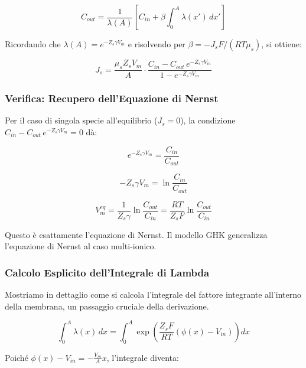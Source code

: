 \begin{equation}
C_{out} = \frac{1}{\lambda(A)}\left[C_{in} + \beta \int_0^A \lambda(x')\,dx'\right]
\end{equation}

Ricordando che $\lambda(A) = e^{-Z_s \gamma V_m}$ e risolvendo per $\beta = -J_s F/(RT\mu_s)$, si ottiene:

\begin{equation}
J_s = \frac{\mu_s Z_s  V_m}{A} \cdot \frac{C_{in} - C_{out}\,e^{-Z_s \gamma V_m}}{1 - e^{-Z_s \gamma V_m}}
\end{equation}

\subsubsection{Verifica: Recupero dell'Equazione di Nernst}

Per il caso di singola specie all'equilibrio ($J_s = 0$), la condizione $C_{in} - C_{out}\,e^{-Z_s \gamma V_m} = 0$ dà:

\begin{equation}
e^{-Z_s \gamma V_m} = \frac{C_{in}}{C_{out}}
\end{equation}

\begin{equation}
-Z_s \gamma V_m = \ln\frac{C_{in}}{C_{out}}
\end{equation}

\begin{equation}
V_m^{eq} = \frac{1}{Z_s \gamma} \ln\frac{C_{out}}{C_{in}} = \frac{RT}{Z_s F} \ln\frac{C_{out}}{C_{in}}
\end{equation}

Questo è esattamente l'equazione di Nernst. Il modello GHK generalizza l'equazione di Nernst al caso multi-ionico.

\subsubsection{Calcolo Esplicito dell'Integrale di Lambda}

Mostriamo in dettaglio come si calcola l'integrale del fattore integrante all'interno della membrana, un passaggio cruciale della derivazione.

\begin{equation}
\int_0^A \lambda(x)\,dx = \int_0^A \exp\left(\frac{Z_s F}{RT}(\phi(x) - V_{in})\right)dx
\end{equation}

Poiché $\phi(x) - V_{in} = -\frac{V_m}{A}x$, l'integrale diventa:

